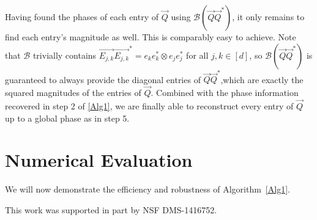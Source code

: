 \documentclass[]{spie}  %
\def \vec{\overrightarrow}
\def \B {\mathcal{B}}
\begin{document}
Having found the phases of each entry of $\vec{Q}$ using $\B ( \vec{Q} \vec{Q}^* )$, it only remains to find each entry's magnitude as well.  This is comparably easy to achieve.  Note that $\B$ trivially contains $\vec{E_{j,k}}\vec{E_{j,k}}^* = e_ke_k^* \otimes e_je_j^*$ for all $j, k \in [d]$, so $\B ( \vec{Q} \vec{Q}^* )$ is guaranteed to always provide the diagonal entries of $\vec{Q} \vec{Q}^*$,which are exactly the squared magnitudes of the entries of $\vec{Q}$.  Combined with the phase information recovered in step 2 of \ref{Alg1}, we are finally able to reconstruct every entry of $\vec{Q}$ up to a global phase as in step 5.


\section{Numerical Evaluation}
\label{sec:Numerics}

We will now demonstrate the efficiency and robustness of Algorithm~\ref{Alg1}.


\acknowledgments %
 
This work was supported in part by NSF DMS-1416752.%

\end{document}
